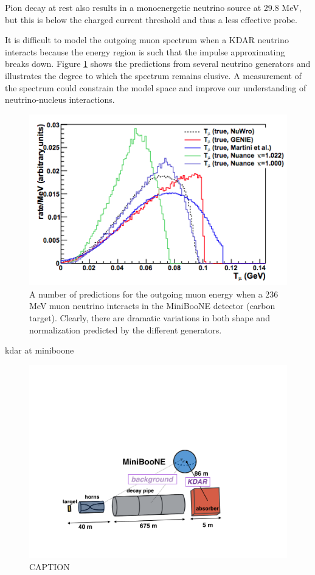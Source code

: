 \documentclass[
aps,
prl,
reprint,
showpacs,
]{revtex4-1}
\begin{document}
Pion decay at rest also results in a monoenergetic neutrino source at 29.8 MeV, but this is below the charged current threshold and thus a less effective probe.

It is difficult to model the outgoing muon spectrum when a KDAR neutrino interacts because the energy region is such that the impulse approximating breaks down. Figure \ref{fig:landscape} shows the predictions from several neutrino generators and illustrates the degree to which the spectrum remains elusive. A measurement of the spectrum could constrain the model space and improve our understanding of neutrino-nucleus interactions.

\begin{figure}[h]
\includegraphics[width=.95\linewidth]{img/kdarLandscape} 
\caption{A number of predictions for the outgoing muon energy when a 236 MeV muon neutrino interacts in the MiniBooNE detector (carbon target). Clearly, there are dramatic variations in both shape and normalization predicted by the different generators.}
\label{fig:landscape}
\end{figure}

kdar at miniboone

\begin{figure}[h]
\includegraphics[width=.95\linewidth]{img/beamSchematic} 
\caption{CAPTION}
\label{fig:beam}
\end{figure}
\end{document}
